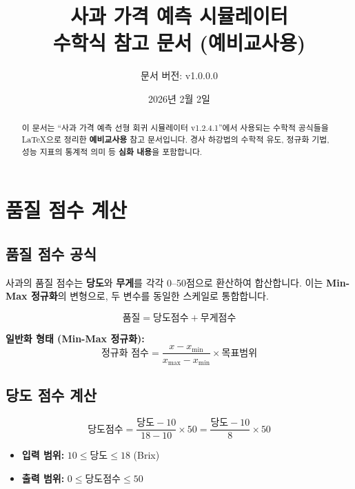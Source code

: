 \documentclass[11pt,a4paper]{article}
\title{\Huge\textbf{\texttwemoji{red apple} 사과 가격 예측 시뮬레이터}\\[0.5em]
\Large 수학식 참고 문서 \textbf{(예비교사용)}}
\author{문서 버전: v1.0.0.0}
\date{2026년 2월 2일}
\begin{document}
\maketitle

\begin{abstract}
이 문서는 ``사과 가격 예측 선형 회귀 시뮬레이터 v1.2.4.1''에서 사용되는 
수학적 공식들을 LaTeX으로 정리한 \textbf{예비교사용} 참고 문서입니다.
경사 하강법의 수학적 유도, 정규화 기법, 성능 지표의 통계적 의미 등
\textbf{심화 내용}을 포함합니다.
\end{abstract}

\tableofcontents
\newpage

\section{ 품질 점수 계산}

\subsection{품질 점수 공식}

사과의 품질 점수는 \textbf{당도}와 \textbf{무게}를 각각 0--50점으로 환산하여 합산합니다.
이는 \textbf{Min-Max 정규화}의 변형으로, 두 변수를 동일한 스케일로 통합합니다.

\begin{tcolorbox}[colback=lightcyan,colframe=teal,title=\textbf{\texttwemoji{sparkles} 품질 점수 공식}]
\begin{equation}
\boxed{\text{품질} = \text{당도점수} + \text{무게점수}}
\end{equation}

\textbf{일반화 형태 (Min-Max 정규화):}
\begin{equation}
\text{정규화 점수} = \frac{x - x_{\min}}{x_{\max} - x_{\min}} \times \text{목표범위}
\end{equation}
\end{tcolorbox}

\subsection{ 당도 점수 계산}

\begin{tcolorbox}[colback=lightblue,colframe=darkblue,title=\textbf{당도 점수 공식}]
\begin{equation}
\text{당도점수} = \frac{\text{당도} - 10}{18 - 10} \times 50 = \frac{\text{당도} - 10}{8} \times 50
\end{equation}

\begin{itemize}
    \item \textbf{입력 범위:} $10 \leq \text{당도} \leq 18$ (Brix)
    \item \textbf{출력 범위:} $0 \leq \text{당도점수} \leq 50$
\end{itemize}
\end{tcolorbox}
\end{document}
